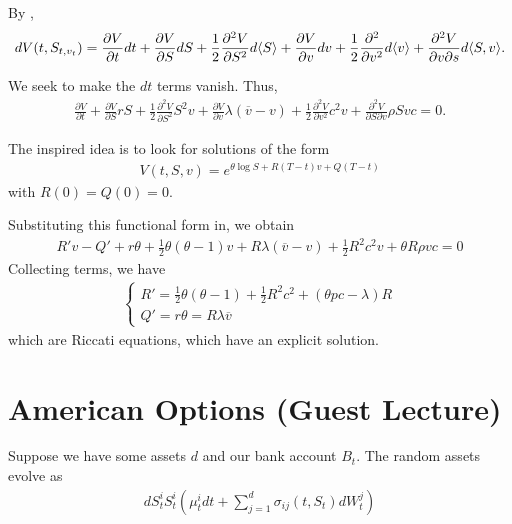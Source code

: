 By \ito,
\begin{align}
  \label{eq:126}
  dV(t, S_{t, v_{t}}) = \frac{\partial V}{\partial t} dt +
  \frac{\partial V}{\partial S} dS + \frac{1}{2} \frac{\partial^{2}
    V}{\partial S^{2}} d \IP{S} + \frac{\partial V}{\partial v} dv +
  \frac{1}{2} \frac{\partial^{2}}{\partial v^{2}} d \IP{v} +
  \frac{\partial^{2} V}{\partial v \partial s} d \IP{S, v}.
\end{align}

We seek to make the $dt$ terms vanish.  Thus,
\begin{align}
  \label{eq:127}
  \frac{\partial V}{\partial t} + \frac{\partial V}{\partial S} rS +
  \frac{1}{2} \frac{\partial^{2} V}{\partial S^{2}} S^{2} v +
  \frac{\partial V}{\partial v} \lambda (\overline v - v) +
  \frac{1}{2} \frac{\partial^{2} V}{\partial v^{2}} c^{2} v +
  \frac{\partial^{2} V}{\partial S \partial v} \rho S v c = 0.
\end{align}

The inspired idea is to look for solutions of the form
\begin{align}
  \label{eq:128}
  V(t, S, v) = e^{\theta \log S + R(T-t)v + Q(T-t)}
\end{align} with $R(0) = Q(0) = 0$.

Substituting this functional form in, we obtain 
\begin{align}
  \label{eq:129}
  R'v - Q' + r \theta + \frac{1}{2} \theta (\theta - 1) v + R \lambda
  (\overline v - v) + \frac{1}{2} R^{2} c^{2} v + \theta R \rho v c =
  0
\end{align}  Collecting terms, we have
\begin{align}
  \label{eq:130}
  \begin{cases}
    R' = \frac{1}{2} \theta (\theta - 1) + \frac{1}{2} R^{2} c^{2} +
    (\theta p c - \lambda) R \\
    Q' = r \theta = R \lambda \overline v
  \end{cases}
\end{align} which are Riccati equations, which have an explicit solution.


\section{American Options (Guest Lecture)}
\label{sec:amer-opti-guest}

Suppose we have some assets $d$ and our bank account $B_{t}$.  The random
assets evolve as
\begin{align}
  \label{eq:131}
  dS^{i}_{t} S^{i}_{t}(\mu^{i}_{t} dt + \sum_{j=1}^{d} \sigma_{ij}(t,
  S_{t}) dW_{t}^{j})
\end{align}

